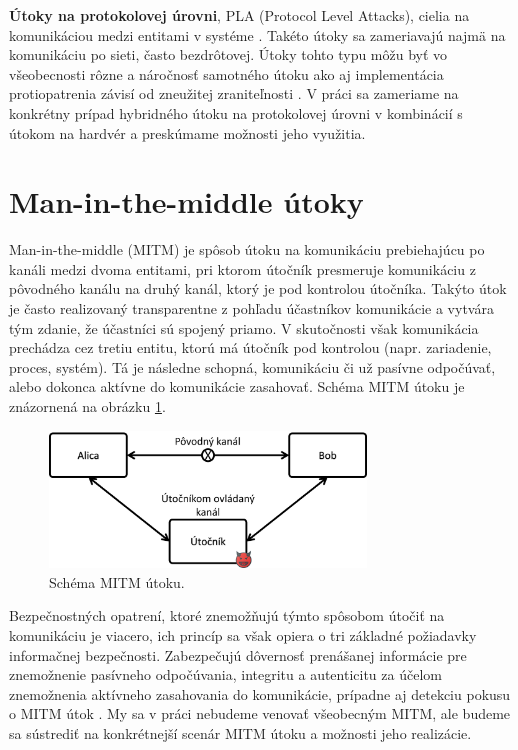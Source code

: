 \textbf{Útoky na protokolovej úrovni}, PLA (Protocol Level Attacks), cielia na komunikáciou medzi entitami v systéme \cite{mitmPCIe}. Takéto útoky sa zameriavajú najmä na komunikáciu po sieti, často bezdrôtovej. Útoky tohto typu môžu byť vo všeobecnosti rôzne a náročnosť samotného útoku ako aj implementácia protiopatrenia závisí od zneužitej zraniteľnosti \cite{mitmPCIe}. V práci sa zameriame na konkrétny prípad hybridného útoku na protokolovej úrovni v kombinácií s útokom na hardvér a preskúmame možnosti jeho využitia.

\section{Man-in-the-middle útoky}
Man-in-the-middle (MITM) je spôsob útoku na komunikáciu prebiehajúcu po kanáli medzi dvoma entitami, pri ktorom útočník presmeruje komunikáciu z pôvodného kanálu na druhý kanál, ktorý je pod kontrolou útočníka. Takýto útok je často realizovaný transparentne z pohľadu účastníkov komunikácie  a vytvára tým zdanie, že účastníci sú spojený priamo. V skutočnosti však komunikácia prechádza cez tretiu entitu, ktorú má útočník pod kontrolou (napr. zariadenie, proces, systém). Tá je následne schopná, komunikáciu či už pasívne odpočúvať, alebo dokonca aktívne do komunikácie zasahovať. Schéma MITM útoku je znázornená na obrázku \ref{obr:mitm}.

\begin{figure}
    \centerline{\includegraphics[width=0.75\textwidth]{images/mitm.png}}
    \caption[Schéma MITM útoku]{Schéma MITM útoku.}
    \label{obr:mitm}
\end{figure}

Bezpečnostných opatrení, ktoré znemožňujú týmto spôsobom útočiť na komunikáciu je viacero, ich princíp sa však opiera o tri základné požiadavky informačnej bezpečnosti. Zabezpečujú dôvernosť prenášanej informácie pre znemožnenie pasívneho odpočúvania, integritu a autenticitu za účelom znemožnenia aktívneho zasahovania do komunikácie, prípadne aj detekciu pokusu o MITM útok \cite{mitmTheory}. My sa v práci nebudeme venovať všeobecným MITM, ale budeme sa sústrediť na konkrétnejší scenár MITM útoku a možnosti jeho realizácie.

